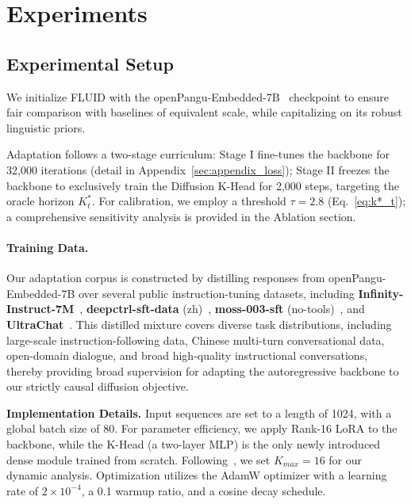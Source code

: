 \documentclass[11pt]{article}
\begin{document}
\section{Experiments}
\subsection{Experimental Setup}
\label{sec:exp_setup}

We initialize FLUID with the openPangu-Embedded-7B~\citep{pangu} checkpoint to ensure fair comparison with baselines of equivalent scale, while capitalizing on its robust linguistic priors. 

Adaptation follows a two-stage curriculum: Stage I fine-tunes the backbone for 32,000 iterations (detail in Appendix~\ref{sec:appendix_loss}); Stage II freezes the backbone to exclusively train the Diffusion K-Head for 2,000 steps, targeting the oracle horizon $K_{t}^{*}$. For calibration, we employ a threshold $\tau = 2.8$ (Eq.~\ref{eq:k*_t}); a comprehensive sensitivity analysis is provided in the Ablation section.

\paragraph{Training Data.}
Our adaptation corpus is constructed by distilling responses from openPangu-Embedded-7B over several public instruction-tuning datasets, including \textbf{Infinity-Instruct-7M}~\citep{Infinity_Instruct_7M}, \textbf{deepctrl-sft-data} (zh)~\citep{deepctrl}, \textbf{moss-003-sft} (no-tools)~\citep{moss}, and \textbf{UltraChat}~\citep{ultraChat}. This distilled mixture covers diverse task distributions, including large-scale instruction-following data, Chinese multi-turn conversational data, open-domain dialogue, and broad high-quality instructional conversations, thereby providing broad supervision for adapting the autoregressive backbone to our strictly causal diffusion objective.

\textbf{Implementation Details.} Input sequences are set to a length of 1024, with a global batch size of 80. For parameter efficiency, we apply Rank-16 LoRA to the backbone, while the K-Head (a two-layer MLP) is the only newly introduced dense module trained from scratch. Following~\citep{BlockDiffusion}, we set $K_{max} = 16$ for our dynamic analysis. Optimization utilizes the AdamW optimizer with a learning rate of $2 \times 10^{-4}$, a 0.1 warmup ratio, and a cosine decay schedule.
\end{document}
